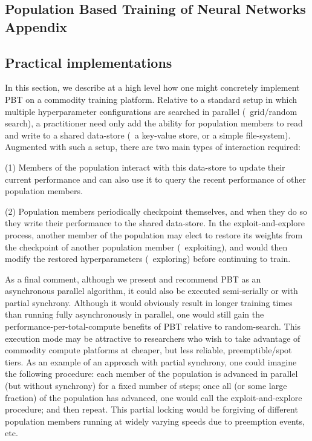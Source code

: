 \begin{appendices}




\newpage
\section{Population Based Training of Neural Networks Appendix}\label{sec:appendix}

\subsection{Practical implementations}\label{sec:practicum}

In this section, we describe at a high level how one might concretely implement PBT on a commodity training platform.
%
Relative to a standard setup in which multiple hyperparameter configurations are searched in parallel
(\eg~grid/random search), a practitioner need only add the ability for population members to read and write to a shared data-store (\eg~a key-value store, or a simple file-system). Augmented with such a setup, there are two main types of interaction required: 


(1)  Members of the population interact with this data-store to update their current performance and can also use it to query the recent performance of other population members.

(2)  Population members periodically checkpoint themselves, and when they do so they write their performance to the shared data-store. In the exploit-and-explore process, another member of the population may elect to restore its weights from the checkpoint of another population member (\ie~exploiting), and would then modify the restored hyperparameters (\ie~exploring) before continuing to train.

As a final comment, although we present and recommend PBT as an asynchronous parallel algorithm, it could also be executed  semi-serially or with partial synchrony. 
%
Although it would obviously result in longer training times than running fully asynchronously in parallel, one would still gain the performance-per-total-compute benefits of PBT relative to random-search. This execution mode may be attractive to researchers who wish to take advantage of commodity compute platforms at cheaper, but less reliable, preemptible/spot tiers.
%
As an example of an approach with partial synchrony, one could imagine the following procedure: each member of the population is advanced in parallel (but without synchrony) for a fixed number of steps;  once all (or some large fraction) of the population has advanced, one would call the exploit-and-explore procedure; and then repeat. This partial locking would be forgiving of different population members running at widely varying speeds due to preemption events, etc.


\end{appendices}
